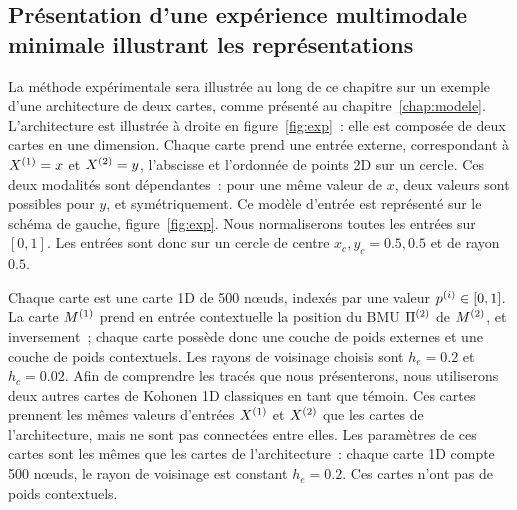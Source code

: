 \documentclass[../main]{subfiles}
\begin{document}
\subsection{Présentation d'une expérience multimodale minimale illustrant les représentations}

La méthode expérimentale sera illustrée au long de ce chapitre sur un exemple d'une architecture de deux cartes, comme présenté au chapitre~\ref{chap:modele}.
L'architecture est illustrée à droite en figure~\ref{fig:exp}~: elle est composée de deux cartes en une dimension. Chaque carte prend une entrée externe, correspondant à $X^{({1})}=x$ et $X^{({2})}=y$, l'abscisse et l'ordonnée de points 2D sur un cercle. 
Ces deux modalités sont dépendantes~: pour une même valeur de $x$, deux valeurs sont possibles pour $y$, et symétriquement. Ce modèle d'entrée est représenté sur le schéma de gauche, figure~\ref{fig:exp}.
Nous normaliserons toutes les entrées sur $[0,1]$. Les entrées sont donc sur un cercle de centre $x_c,y_c = 0.5,0.5$ et de rayon $0.5$.

Chaque carte est une carte 1D de 500 n\oe{}uds, indexés par une valeur $p^{({i})} \in [0,1]$.
La carte $M^{({1})}$ prend en entrée contextuelle la position du BMU $\Pi^{({2})}$ de $M^{({2})}$, et inversement~; chaque carte possède donc une couche de poids externes et une couche de poids contextuels. Les rayons de voisinage choisis sont $h_e = 0.2$ et $h_c = 0.02$.
Afin de comprendre les tracés que nous présenterons, nous utiliserons deux autres cartes de Kohonen 1D classiques en tant que témoin.
Ces cartes prennent les mêmes valeurs d'entrées $X^{({1})}$ et $X^{({2})}$ que les cartes de l'architecture, mais ne sont pas connectées entre elles. 
Les paramètres de ces cartes sont les mêmes que les cartes de l'architecture~: chaque carte 1D compte 500 n\oe{}uds, le rayon de voisinage est constant $h_e = 0.2$. Ces cartes n'ont pas de poids contextuels.
\end{document}
